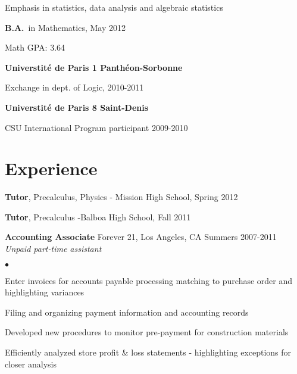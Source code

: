 \documentclass[margin,line,pifont,palatino,courier]{res}
\newenvironment{list1}{
  \begin{list}{\ding{113}}{%
      \setlength{\itemsep}{0in}
      \setlength{\parsep}{0in} \setlength{\parskip}{0in}
      \setlength{\topsep}{0in} \setlength{\partopsep}{0in}
      \setlength{\leftmargin}{0.17in}}}{\end{list}}
\newenvironment{list2}{
  \begin{list}{$\bullet$}{%
      \setlength{\itemsep}{0in}
      \setlength{\parsep}{0in} \setlength{\parskip}{0in}
      \setlength{\topsep}{0in} \setlength{\partopsep}{0in}
      \setlength{\leftmargin}{0.2in}}}{\end{list}}
\begin{document}
\begin{resume}
\begin{list1}
Emphasis in statistics, data analysis and algebraic statistics 

\item \textbf{B.A.}~in %
Mathematics, May 2012

Math GPA: 3.64  \\




\item {\bf Universtit\'{e} de Paris 1 Panth\'{e}on-Sorbonne}


Exchange in dept. of Logic, 2010-2011\\

\item {\bf Universtit\'{e} de Paris 8 Saint-Denis}


CSU International Program participant 2009-2010\\


\end{list1}





\section{\sc Experience}

\begin{list1}
\item \textbf{Tutor}, Precalculus, Physics - Mission High School,    Spring 2012  \\

\item  \textbf{Tutor}, Precalculus  -Balboa High School,  Fall  2011  \\

 \item  \textbf{Accounting Associate } Forever 21, Los Angeles, CA 	Summers 2007-2011\\	
  	\textit{Unpaid part-time assistant }
	\begin{list2}
	\item Enter invoices for accounts payable processing \- matching to purchase order and highlighting variances
	\item  Filing and organizing payment information and  accounting records
	\item  Developed new procedures to monitor pre-payment for construction materials 
	\item Efficiently analyzed store profit \& loss statements - highlighting exceptions for closer analysis
	\end{list2}



\end{list1}
\end{resume}
\end{document}
